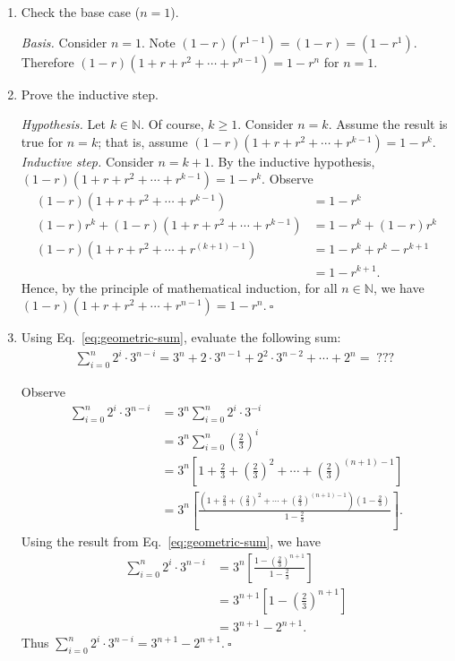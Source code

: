 \begin{enumerate}
    \item Check the base case ($n=1$).
\begin{solution}
\textit{Basis. }Consider $n=1$. Note $(1-r)(r^{1-1})=(1-r)=(1-r^1)$. Therefore $(1-r)(1+r+r^2+\cdots+r^{n-1})=1-r^n$ for $n=1$.
\end{solution}   
    \item Prove the inductive step.
\begin{solution}
\textit{Hypothesis. }Let $k\in\mathbb{N}$. Of course, $k\geq 1$. Consider $n=k$. Assume the result is true for $n=k$; that is, assume $(1-r)(1+r+r^2+\cdots+r^{k-1})=1-r^k$.\\

\textit{Inductive step. }Consider $n=k+1$. By the inductive hypothesis, $(1-r)(1+r+r^2+\cdots+r^{k-1})=1-r^k$. Observe
\begin{align*}
(1-r)(1+r+r^2+\cdots+r^{k-1})&=1-r^k\\
(1-r)r^k+(1-r)(1+r+r^2+\cdots+r^{k-1})&=1-r^k+(1-r)r^k\\
(1-r)(1+r+r^2+\cdots+r^{(k+1)-1})&=1-r^k+r^k-r^{k+1}\\
&=1-r^{k+1}.
\end{align*}
Hence, by the principle of mathematical induction, for all $n\in\mathbb{N}$, we have $(1-r)(1+r+r^2+\cdots+r^{n-1})=1-r^n$.$~\square$
\end{solution}
    \item Using Eq.~\eqref{eq:geometric-sum}, evaluate the following sum:
    \begin{align*}
        \sum_{i = 0}^n 2^i \cdot 3^{n-i}
        =
        3^n + 2\cdot 3^{n-1} + 2^2 \cdot 3^{n-2} + \cdots + 2^n =\; ???\;
    \end{align*}
\begin{solution}
Observe
\begin{align*}
\sum_{i=0}^{n}{2^i\cdot3^{n-i}}&=3^n\sum_{i=0}^{n}{2^i\cdot3^{-i}}\\
&=3^n\sum_{i=0}^n{\left(\frac{2}{3}\right)^i}\\
&=3^n\left[1+\frac{2}{3}+\left(\frac{2}{3}\right)^2+\cdots+\left(\frac{2}{3}\right)^{(n+1)-1}\right]\\
&=3^n\left[\frac{\left(1+\frac{2}{3}+\left(\frac{2}{3}\right)^2+\cdots+\left(\frac{2}{3}\right)^{(n+1)-1}\right)\left(1-\frac{2}{3}\right)}{1-\frac{2}{3}}\right].
\end{align*}
Using the result from Eq.~\eqref{eq:geometric-sum}, we have
\begin{align*}
\sum_{i=0}^{n}{2^i\cdot3^{n-i}}&=3^n\left[\frac{1-\left(\frac{2}{3}\right)^{n+1}}{1-\frac{2}{3}}\right]\\
&=3^{n+1}\left[1-\left(\frac{2}{3}\right)^{n+1}\right]\\
&=3^{n+1}-2^{n+1}.
\end{align*}
Thus $\sum_{i=0}^{n}{2^i\cdot3^{n-i}}=3^{n+1}-2^{n+1}$.$~\square$
\end{solution}
\end{enumerate}
\newpage

